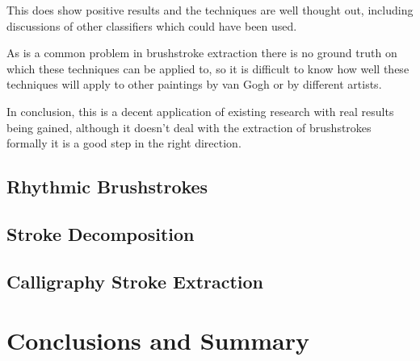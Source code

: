 \documentclass[conference]{IEEEtran}
\begin{document}
This does show positive results and the techniques are well thought out,
including discussions of other classifiers which could have been used.

As is a common problem in brushstroke extraction there is no ground truth on
which these techniques can be applied to, so it is difficult to know how well
these techniques will apply to other paintings by van Gogh or by different
artists.

In conclusion, this is a decent application of existing research with real
results being gained, although it doesn't deal with the extraction of
brushstrokes formally it is a good step in the right direction.

\subsection{Rhythmic Brushstrokes}

\subsection{Stroke Decomposition}

\subsection{Calligraphy Stroke Extraction}

\section{Conclusions and Summary}









\end{document}
